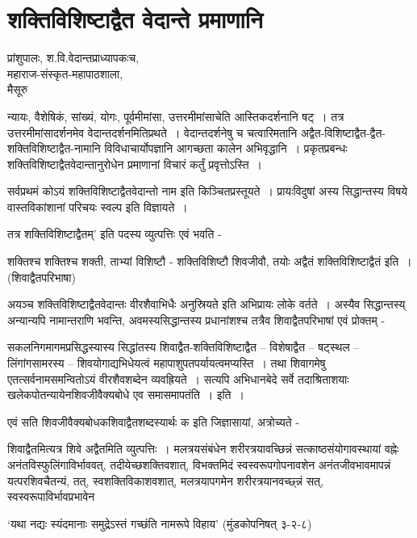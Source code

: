 {\fontsize{15}{17}\selectfont
\presetvalues
\chapter{शक्तिविशिष्टाद्वैत वेदान्ते प्रमाणानि}

\begin{center}
\smallskip
प्रांशुपालः, श.वि.वेदान्तप्राध्यापकःच,\\
महाराज-संस्कृत-महापाठशाला,\\
मैसूरु
\addrule
\end{center}
न्यायः, वैशेषिकं, सांख्यं, योगः, पूर्वमीमांसा, उत्तरमीमांसाचेति आस्तिकदर्शनानि षट्~। तत्र उत्तरमीमांसादर्शनमेव वेदान्तदर्शनमितिप्रथते~। वेदान्तदर्शनेषु च चत्वारिमतानि अद्वैत-विशिष्टाद्वैत-द्वैत-शक्तिविशिष्टाद्वैत-नामानि विविधाचार्योपज्ञानि आगच्छता कालेन अभिवृद्धानि~। प्रकृतप्रबन्धः शक्तिविशिष्टाद्वैतवेदान्तानुरोधेन प्रमाणानां विचारं कर्तुं प्रवृत्तोऽस्ति~। 

सर्वप्रथमं कोऽयं शक्तिविशिष्टाद्वैतवेदान्तो नाम इति किञ्चितप्रस्तूयते~। प्रायःविदुषां अस्य सिद्धान्तस्य विषये वास्तविकांशानां परिचयः स्वल्प इति विज्ञायते~। 

तत्र  शक्तिविशिष्टाद्वैतम्’ इति पदस्य व्युत्पत्तिः एवं भवति -

शक्तिश्च शक्तिश्च शक्ती, ताभ्यां विशिष्टौ -  शक्तिविशिष्टौ शिवजीवौ, तयोः अद्वैतं शक्तिविशिष्टाद्वैतं इति~। (शिवाद्वैतपरिभाषा)

अयञ्च शक्तिविशिष्टाद्वैतवेदान्तः वीरशैवाभिधैः अनुस्रियते इति अभिप्रायः लोके वर्तते~। अस्यैव सिद्धान्तस्य् अन्यान्यपि नामान्तराणि भवन्ति, अवमस्यसिद्धान्तस्य प्रधानांशश्च तत्रैव शिवाद्वैतपरिभाषां एवं प्रोक्तम् -

सकलनिगमागमप्रसिद्धस्यास्य सिद्धांतस्य शिवाद्वैत-शक्तिविशिष्टाद्वैत – विशेषाद्वैत – षट्स्थल – लिंगांगसामरस्य – शिवयोगाद्यभिधेयत्वं महापाशुपतपर्यायत्वमप्यस्ति~। तथा शिवागमेषु एतत्सर्वनामसमन्वितोऽयं वीरशैवशब्देन व्यवह्रियते~। सत्यपि अभिधानबेदे सर्वे तदाश्रिताशयाः खलेकपोतन्यायेनशिवजीवैक्यबोधे एव समासमापतंति~। इति~। 

एवं सति शिवजीवैक्यबोधकशिवाद्वैतशब्दस्यार्थः क  इति जिज्ञासायां, अत्रोच्यते -

शिवाद्वैतमित्यत्र शिवे अद्वैतमिति व्युत्पत्तिः~। मलत्रयसंबंधेन शरीरत्रयावच्छिन्नं सत्काष्ठसंयोगावस्थायां वह्नेः अनंतविस्फुलिंगाविर्भाववत्, तदीयेच्छशक्तिवशात्, विभक्तमिदं स्वस्वरूपगोपनावशेन अनंतजीवभावमापन्नं यत्परशिवचैतन्यं, तत्, स्वशक्तिविकाशवशात्, मलत्रयापगमेन शरीरत्रयानवच्छ्न्नं सत्,  स्वस्वरूपाविर्भावप्रभावेन

‘यथा नद्यः स्यंदमानाः समुद्रेऽस्तं गच्छंति नामरूपे विहाय’ (मुंडकोपनिषत् ३-२-८)

}
